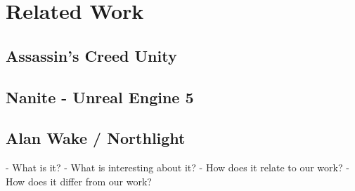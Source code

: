 \chapter{Related Work} \label{cpt-related-work}



\section{Assassin's Creed Unity}

\section{Nanite - Unreal Engine 5}

\section{Alan Wake / Northlight}





- What is it?
- What is interesting about it?
- How does it relate to our work?
- How does it differ from our work?
